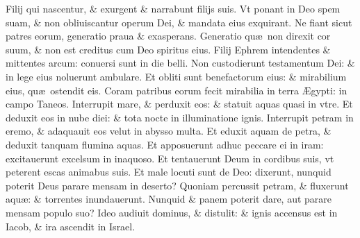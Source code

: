 \documentclass[a5paper,10pt]{book}
\def\ae{æ}
\def\AE{Æ}
\begin{document}
\begin{multicols*}{2}
\newline \color{red} F\color{black}ilij qui nascentur, \& exurgent \& narrabunt filijs suis.
\newline \color{red} V\color{black}t ponant in Deo spem suam, \& non obliuiscantur operum Dei, \& mandata eius exquirant.
\newline \color{red} N\color{black}e fiant sicut patres eorum, generatio praua \& exasperans.
\newline \color{red} G\color{black}eneratio qu\ae \ non direxit cor suum, \& non est creditus cum Deo spiritus eius.
\newline \color{red} F\color{black}ilij Ephrem intendentes \& mittentes arcum: conuersi sunt in die belli.
\newline \color{red} N\color{black}on custodierunt testamentum Dei: \& in lege eius noluerunt ambulare.
\newline \color{red} E\color{black}t obliti sunt benefactorum eius: \& mirabilium eius, qu\ae \ ostendit eis.
\newline \color{red} C\color{black}oram patribus eorum fecit mirabilia in terra \AE gypti: in campo Taneos.
\newline \color{red} I\color{black}nterrupit mare, \& perduxit eos: \& statuit aquas quasi in vtre.
\newline \color{red} E\color{black}t deduxit eos in nube diei: \& tota nocte in illuminatione ignis.
\newline \color{red} I\color{black}nterrupit petram in eremo, \& adaquauit eos velut in abysso multa.
\newline \color{red} E\color{black}t eduxit aquam de petra, \& deduxit tanquam flumina aquas.
\newline \color{red} E\color{black}t apposuerunt adhuc peccare ei in iram: excitauerunt excelsum in inaquoso.
\newline \color{red} E\color{black}t tentauerunt Deum in cordibus suis, vt peterent escas animabus suis.
\newline \color{red} E\color{black}t male locuti sunt de Deo: dixerunt, nunquid poterit Deus parare mensam in deserto?
\newline \color{red} Q\color{black}uoniam percussit petram, \& fluxerunt aqu\ae : \& torrentes inundauerunt.
\newline \color{red} N\color{black}unquid \& panem poterit dare, aut parare mensam populo suo?
\newline \color{red} I\color{black}deo audiuit dominus, \& distulit: \& ignis accensus est in Iacob, \& ira ascendit in Israel.

\end{multicols*}
\end{document}
